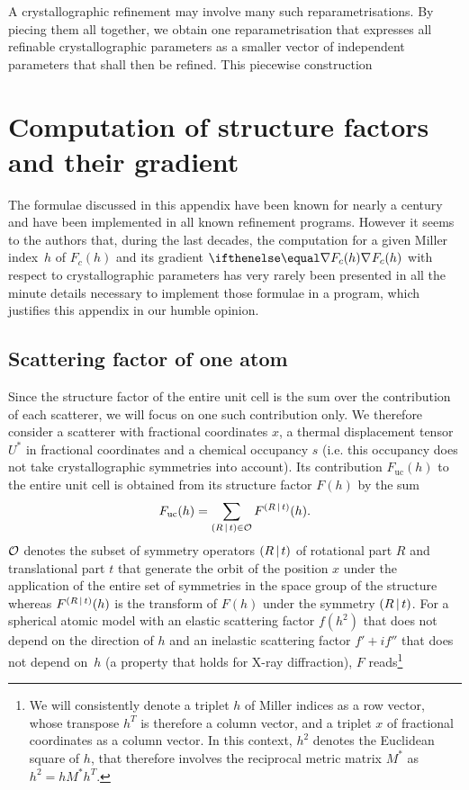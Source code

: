 \documentclass{iucr}
\begin{document}
A crystallographic refinement may involve many such reparametrisations. By piecing them all together, we obtain one reparametrisation that expresses all refinable crystallographic parameters as a smaller vector of independent parameters that shall then be refined. This piecewise construction

\appendix
\section{Computation of structure factors and their gradient}

The formulae discussed in this appendix have been known for nearly a century and have been implemented in all known refinement programs. However it seems to the authors that, during the last decades, the computation for a given Miller index~$h$ of $F_c(h)$ and its gradient $\grad{F_c(h)}$ with respect to crystallographic parameters has very rarely been presented in all the minute details necessary to implement those formulae in a program, which justifies this appendix in our humble opinion.

\subsection{Scattering factor of one atom}

\newcommand{\Fuc}{F_{\text{uc}}}

Since the structure factor of the entire unit cell is the sum over the contribution of each scatterer, we will focus on one such contribution only. We therefore consider a scatterer with  fractional coordinates $x$, a thermal displacement tensor $U^*$ in fractional coordinates and a chemical occupancy $s$ (i.e. this occupancy does not take crystallographic symmetries into account).  Its contribution $\Fuc(h)$ to the entire unit cell is obtained from its  structure factor $F(h)$  by the sum
\begin{equation}
\Fuc(h) = \sum_{\sym{R}{t} \in \cal{O}} F^{\sym{R}{t}}(h).
\end{equation}
$\cal{O}$ denotes the subset of symmetry operators $\left( R\,\vert\, t \right)$ of rotational part $R$ and translational part $t$ that generate the orbit of the position $x$ under the application of the entire set of symmetries in the space group of the structure whereas $F^{\left( R\,\vert\, t \right)}(h)$ is the transform of $F(h)$ under the symmetry $\left( R\,\vert\, t \right)$. For a spherical atomic model with an elastic scattering factor $f(h^2)$ that does not depend on the direction of $h$ and an inelastic scattering factor $f' + if''$ that does not depend on~$h$ (a property that holds for X-ray diffraction), $F$ reads\footnote{We will consistently denote a triplet $h$ of Miller indices as a row vector, whose transpose $h^T$ is therefore a column vector, and a triplet $x$ of fractional coordinates as a column vector. In this context, $h^2$ denotes the Euclidean square of $h$, that therefore involves the reciprocal metric matrix $M^*$ as $h^2 = h M^* h^T$.}
\end{document}
